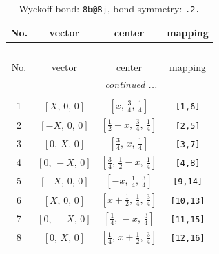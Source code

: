\documentclass[fleqn,8pt]{jsarticle}
\begin{document}
\renewcommand{\arraystretch}{1.2}
\begin{longtable}{cccc}
\caption{Wyckoff bond: {\tt 8b@8j}, bond symmetry: {\tt .2.}}
 \\
 \hline \hline
No. & vector & center & mapping \\ \hline \endfirsthead

\multicolumn{3}{l}{\tablename\ \thetable{}} \\
 \hline \hline
No. & vector & center & mapping \\ \hline \endhead

 \hline \hline
\multicolumn{3}{r}{\footnotesize\it continued ...} \\ \endfoot

 \hline \hline
\multicolumn{3}{r}{} \\ \endlastfoot

1 & $\left[ X,\, 0,\, 0 \right]$ & $\left[ x,\, \frac{3}{4},\, \frac{1}{4} \right]$ & {\tt [1,6]} \\ \hline
2 & $\left[ - X,\, 0,\, 0 \right]$ & $\left[ \frac{1}{2} - x,\, \frac{3}{4},\, \frac{1}{4} \right]$ & {\tt [2,5]} \\ \hline
3 & $\left[ 0,\, X,\, 0 \right]$ & $\left[ \frac{3}{4},\, x,\, \frac{1}{4} \right]$ & {\tt [3,7]} \\ \hline
4 & $\left[ 0,\, - X,\, 0 \right]$ & $\left[ \frac{3}{4},\, \frac{1}{2} - x,\, \frac{1}{4} \right]$ & {\tt [4,8]} \\ \hline
5 & $\left[ - X,\, 0,\, 0 \right]$ & $\left[ - x,\, \frac{1}{4},\, \frac{3}{4} \right]$ & {\tt [9,14]} \\ \hline
6 & $\left[ X,\, 0,\, 0 \right]$ & $\left[ x + \frac{1}{2},\, \frac{1}{4},\, \frac{3}{4} \right]$ & {\tt [10,13]} \\ \hline
7 & $\left[ 0,\, - X,\, 0 \right]$ & $\left[ \frac{1}{4},\, - x,\, \frac{3}{4} \right]$ & {\tt [11,15]} \\ \hline
8 & $\left[ 0,\, X,\, 0 \right]$ & $\left[ \frac{1}{4},\, x + \frac{1}{2},\, \frac{3}{4} \right]$ & {\tt [12,16]} \\
\end{longtable}
\renewcommand{\arraystretch}{1.2}
\end{document}
